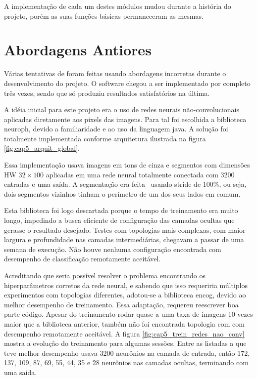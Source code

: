 A implementação de cada um destes módulos mudou durante a história do projeto,
porém as suas funções básicas permaneceram as mesmas.

\section{Abordagens Antiores}
Várias tentativas de foram feitas usando abordagens incorretas durante o
desenvolvimento do projeto. O software chegou a ser implementado por completo
três vezes, sendo que só produziu resultados satisfatórios na última.

A idéia inicial para este projeto era o uso de redes neurais não-convolucionais
aplicadas diretamente aos pixels das imagens. Para tal foi escolhida a
biblioteca neuroph, devido a familiaridade e ao uso da linguagem java. A
solução foi totalmente implementada conforme arquitetura ilustrada na figura
\ref{fig:cap5_arquit_global}.

Essa implementação usava imagens em tons de cinza e segmentos com dimensões HW
$32 \times 100$ aplicadas em uma rede neural totalmente conectada com 3200
entradas e uma saída. A segmentação era feita  usando stride de 100\%, ou
seja, dois segmentos vizinhos tinham o perímetro de um dos seus lados em comum.

Esta biblioteca foi logo descartada porque o tempo de treinamento era muito
longo, impedindo a busca eficiente de configuração das camadas ocultas que
gerasse o resultado desejado. Testes com topologias mais complexas, com maior
largura e profundidade nas camadas intermediárias, chegavam a passar de uma
semana de execução. Não houve nenhuma configuração encontrada com desempenho de
classificação remotamente aceitável.

Acreditando que seria possível resolver o problema encontrando os
hiperparâmetros corretos da rede neural, e sabendo que isso requeriria
múltiplos experimentos com topologias diferentes, adotou-se a biblioteca encog,
devido ao melhor desempenho de treinamento. Essa adaptação, requereu reescrever
boa parte código. Apesar do treinamento rodar quase a uma taxa de imagens 10
vezes maior que a biblioteca anterior, também não foi encontrada topologia
com com desempenho remotamente aceitável. A figura
\ref{fig:cap5_trein_redes_nao_conv} mostra a
evolução do treinamento para algumas sessões. Entre as listadas a que teve
melhor desempenho usava 3200 neurônios na camada de entrada, então 172, 137,
109, 87, 69, 55, 44, 35 e 28 neurônios nas camadas ocultas, terminando
com uma saída.

